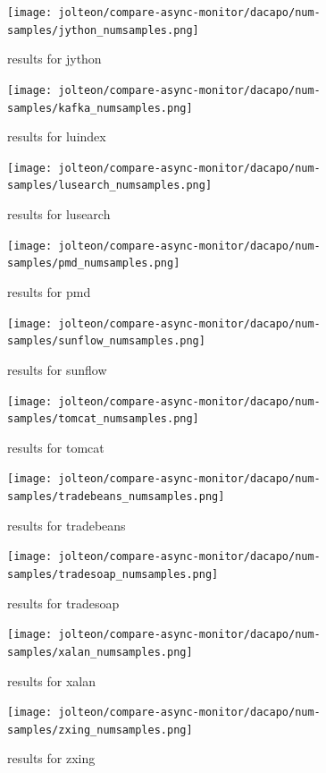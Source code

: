 \documentclass{article}
\begin{document}
    \begin{figure}[H]
    	\centering
    	\texttt{[image: jolteon/compare-async-monitor/dacapo/num-samples/jython\_numsamples.png]}
    	\caption{results for jython}
    \end{figure}
    \begin{figure}[H]
    	\centering
    	\texttt{[image: jolteon/compare-async-monitor/dacapo/num-samples/kafka\_numsamples.png]}
    	\caption{results for luindex}
    \end{figure}
    \begin{figure}[H]
    	\centering
    	\texttt{[image: jolteon/compare-async-monitor/dacapo/num-samples/lusearch\_numsamples.png]}
    	\caption{results for lusearch}
    \end{figure}
    \begin{figure}[H]
    	\centering
    	\texttt{[image: jolteon/compare-async-monitor/dacapo/num-samples/pmd\_numsamples.png]}
    	\caption{results for pmd}
    \end{figure}
    \begin{figure}[H]
    	\centering
    	\texttt{[image: jolteon/compare-async-monitor/dacapo/num-samples/sunflow\_numsamples.png]}
    	\caption{results for sunflow}
    \end{figure}
    \begin{figure}[H]
    	\centering
    	\texttt{[image: jolteon/compare-async-monitor/dacapo/num-samples/tomcat\_numsamples.png]}
    	\caption{results for tomcat}
    \end{figure}
    \begin{figure}[H]
    	\centering
    	\texttt{[image: jolteon/compare-async-monitor/dacapo/num-samples/tradebeans\_numsamples.png]}
    	\caption{results for tradebeans}
    \end{figure}
    \begin{figure}[H]
    	\centering
    	\texttt{[image: jolteon/compare-async-monitor/dacapo/num-samples/tradesoap\_numsamples.png]}
    	\caption{results for tradesoap}
    \end{figure}
    \begin{figure}[H]
    	\centering
    	\texttt{[image: jolteon/compare-async-monitor/dacapo/num-samples/xalan\_numsamples.png]}
    	\caption{results for xalan}
    \end{figure}
    \begin{figure}[H]
    	\centering
    	\texttt{[image: jolteon/compare-async-monitor/dacapo/num-samples/zxing\_numsamples.png]}
    	\caption{results for zxing}
    \end{figure}
\end{document}

